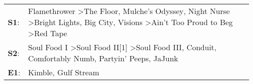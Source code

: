 \begin{supertabular}{p{0.03\textwidth}p{0.92\textwidth}}
 \textbf{S1}:  &  Flamethrower\textsuperscript{} \textgreater \enspace The Floor\textsuperscript{}, \enspace Mulche's Odyssey\textsuperscript{}, \enspace Night Nurse\textsuperscript{} \textgreater \enspace Bright Lights, Big City\textsuperscript{}, \enspace Visions\textsuperscript{} \textgreater \enspace Ain't Too Proud to Beg\textsuperscript{} \textgreater \enspace Red Tape\textsuperscript{}  \enspace  \\
 \textbf{S2}:  &                                                                                 Soul Food I\textsuperscript{} \textgreater \enspace Soul Food II[1]\textsuperscript{} \textgreater \enspace Soul Food III\textsuperscript{}, \enspace Conduit\textsuperscript{}, \enspace Comfortably Numb\textsuperscript{}, \enspace Partyin' Peeps\textsuperscript{}, \enspace JaJunk\textsuperscript{}  \enspace  \\
 \textbf{E1}:  &                                                                                                                                                                                                                                                                                                                           Kimble\textsuperscript{}, \enspace Gulf Stream\textsuperscript{}  \enspace  \\
\end{supertabular}
